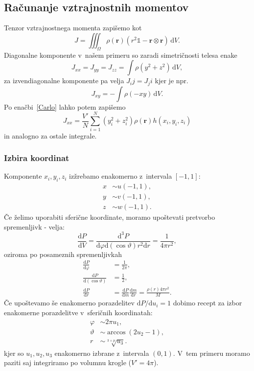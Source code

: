 \documentclass[a4paper,pdftex,10pt]{article}
\renewcommand{\vec}[1]{\boldsymbol{\mathbf{#1}}}
\numberwithin{figure}{section} %
\begin{document}
\subsection{Računanje vztrajnostnih momentov}
Tenzor vztrajnostnega momenta zapišemo kot
\begin{equation} \label{tenzor}
    J = \iiint_{\Omega} \!\rho(\vec{r}) \left(r^2 \mathds{1} - \vec{r} \otimes \vec{r} 
    \right) \,\text{d}V.
\end{equation}
Diagonalne komponente v~našem primeru so zaradi simetričnosti telesa enake
\begin{equation}
    J_{xx} = J_{yy} = J_{zz} = \int \!\rho (y^2 + z^2) \,\text{d}V,
\end{equation}
za izvendiagonalne komponente pa velja $J_ij=J_ji$ kjer je npr.
\begin{equation}
    J_{xy} = - \int \!\rho (-xy) \,\text{d}V.
\end{equation}
Po enačbi~\ref{Carlo} lahko potem zapišemo
\begin{equation}\label{Jxx}
    J_{xx} = \frac{V'}{N} \sum_{i=1}^N (y_i^2 + z_i^2) \rho(\vec{r}) h(x_i,y_i,z_i)
\end{equation}
in analogno za ostale integrale. 

\subsubsection{Izbira koordinat}
Komponente $x_i, y_i, z_i$ izžrebamo enakomerno z~intervala $[-1,1]$:
\begin{align}
    x &\sim u(-1,1), \nonumber\\
    y &\sim v(-1,1), \\
    z &\sim w(-1,1). \nonumber 
\end{align}
Če želimo uporabiti sferične koordinate, moramo upoštevati pretvorbo spremenljivk - velja:
\begin{equation}
    \frac{\mathrm{d} P}{\mathrm{d} V} = \frac{\mathrm{d}^3 P}{\mathrm{d}\varphi \mathrm{d}
    (\cos\vartheta) r^2 \mathrm{d}r} = \frac{1}{4\pi r^2},
\end{equation}
oziroma po posameznih spremenljivkah
\begin{align}
    \frac{\mathrm{d} P}{\mathrm{d} \varphi} &= \frac{1}{2\pi}, \nonumber\\ 
    \frac{\mathrm{d} P}{\mathrm{d} (\cos\vartheta)} &= \frac{1}{2}, \\ 
    \frac{\mathrm{d} P}{\mathrm{d} r} &=  \frac{\mathrm{d} P}{\mathrm{d} m} 
    \frac{\mathrm{d} m}{\mathrm{d} r} = \frac{\rho(r) 4\pi r^2}{M}. \nonumber
\end{align}
Če upoštevamo še enakomerno porazdelitev $\mathrm{d} P/\mathrm{d}u_i =1$ dobimo recept
za izbor enakomerne porazdelitve v~sferičnih koordinatah:
\begin{align}
    \varphi &\sim 2\pi u_1, \nonumber\\
    \vartheta &\sim \arccos(2u_2-1), \\
    r &\sim \sqrt[3+p]{u_3}. \nonumber
\end{align}
kjer so $u_1,u_2,u_3$ enakomerno izbrane z~intervala $(0,1)$. V~tem primeru moramo paziti
saj integriramo po volumnu krogle ($V'=4\pi$).
\end{document}

